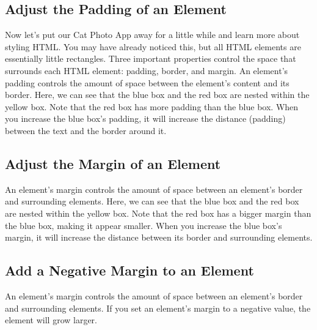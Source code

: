 \documentclass{article}%
\begin{document}
\subsection{Adjust the Padding of an Element}%
\label{subsec:AdjustthePaddingofanElement}%
Now let's put our Cat Photo App away for a little while and learn more about styling HTML.\newline%
You may have already noticed this, but all HTML elements are essentially little rectangles.\newline%
Three important properties control the space that surrounds each HTML element: padding, border, and margin.\newline%
An element's padding controls the amount of space between the element's content and its border.\newline%
Here, we can see that the blue box and the red box are nested within the yellow box. Note that the red box has more padding than the blue box.\newline%
When you increase the blue box's padding, it will increase the distance (padding) between the text and the border around it.\newline%

%
\subsection{Adjust the Margin of an Element}%
\label{subsec:AdjusttheMarginofanElement}%
An element's margin controls the amount of space between an element's border and surrounding elements.\newline%
Here, we can see that the blue box and the red box are nested within the yellow box. Note that the red box has a bigger margin than the blue box, making it appear smaller.\newline%
When you increase the blue box's margin, it will increase the distance between its border and surrounding elements.\newline%

%
\subsection{Add a Negative Margin to an Element}%
\label{subsec:AddaNegativeMargintoanElement}%
An element's margin controls the amount of space between an element's border and surrounding elements.\newline%
If you set an element's margin to a negative value, the element will grow larger.\newline%
\end{document}
